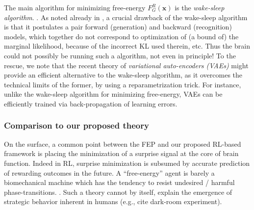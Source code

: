 \documentclass[10pt,letterpaper]{article}
\def\x{\mathbf{x}}
\begin{document}
The main algorithm for minimizing free-energy $F_G^R(\x)$ is the \textit{wake-sleep algorithm}.
\citep{dayan1995helmholtz}. As noted already in \citep{dayan1995helmholtz},
a crucial drawback of the wake-sleep algorithm is that it postulates a pair forward (generation) and backward (recognition) models,
which together do not correspond to optimization of (a bound of) the marginal likelihood, because of the incorrect KL used therein, etc.
Thus the brain could not possibly be running such a algorithm, not even in principle! To the rescue, we note that the recent theory of
\textit{variational auto-encoders (VAEs)} \citep{kingma2013auto} might provide an efficient alternative to the wake-sleep algorithm,
as it overcomes the technical limits of the former, by using a reparametrization trick. For instance, unlike the wake-sleep algorithm
for minimizing free-energy, VAEs can be efficiently trained via back-propagation of learning errors.

\subsubsection{Comparison to our proposed theory}
On the surface, a common point between the FEP and our proposed RL-based framework
  is placing the minimization of a surprise signal at the core of brain function.
  Indeed in RL, surprise minimization is subsumed  by accurate prediction of
  rewarding outcomes in the future. A ``free-energy'' agent is barely a biomechanical machine which has the tendency to resist undesired / harmful phase-transitions.
  \citep{friston2010free,fristonAIorRL,ortega2013thermodynamics}. Such a theory cannot by itself,
  explain the emergence of strategic behavior inherent in humans (e.g.,  cite dark-room experiment).

\end{document}
